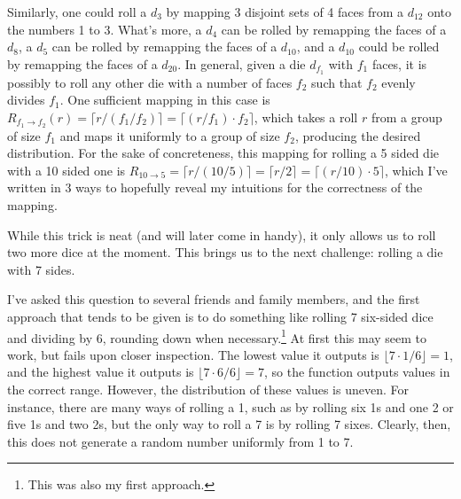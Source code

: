 \documentclass{article}
\begin{document}
\par Similarly, one could roll a $d_3$ by mapping 3 disjoint sets of 4 faces from a $d_{12}$ onto the numbers 1 to 3.
What's more, a $d_4$ can be rolled by remapping the faces of a $d_8$, a $d_5$ can be rolled by remapping the faces of a $d_{10}$, and a $d_{10}$ could be rolled by remapping the faces of a $d_{20}$. 
In general, given a die $d_{f_1}$ with $f_1$ faces, it is possibly to roll any other die with a number of faces $f_2$ such that $f_2$ evenly divides $f_1$.
One sufficient mapping in this case is $R_{f_1 \to f_2}(r) = \lceil r / (f_1 / f_2) \rceil = \lceil (r / f_1) \cdot f_2 \rceil$, which takes a roll $r$ from a group of size $f_1$ and maps it uniformly to a group of size $f_2$, producing the desired distribution.
For the sake of concreteness, this mapping for rolling a 5 sided die with a 10 sided one is $R_{10 \to 5} = \lceil r / (10 / 5) \rceil = \lceil r / 2 \rceil = \lceil (r / 10) \cdot 5 \rceil$, which I've written in 3 ways to hopefully reveal my intuitions for the correctness of the mapping.

\par While this trick is neat (and will later come in handy), it only allows us to roll two more dice at the moment.
This brings us to the next challenge: rolling a die with 7 sides. 

\par I've asked this question to several friends and family members, and the first approach that tends to be given is to do something like rolling 7 six-sided dice and dividing by 6, rounding down when necessary.\footnote{This was also my first approach.}
At first this may seem to work, but fails upon closer inspection.
The lowest value it outputs is $\lfloor 7 \cdot 1 / 6 \rfloor = 1$, and the highest value it outputs is $\lfloor 7 \cdot 6 / 6 \rfloor = 7$, so the function outputs values in the correct range.
However, the distribution of these values is uneven.
For instance, there are many ways of rolling a 1, such as by rolling six 1s and one 2 or five 1s and two 2s, but the only way to roll a 7 is by rolling 7 sixes.
Clearly, then, this does not generate a random number uniformly from 1 to 7.
\end{document}
